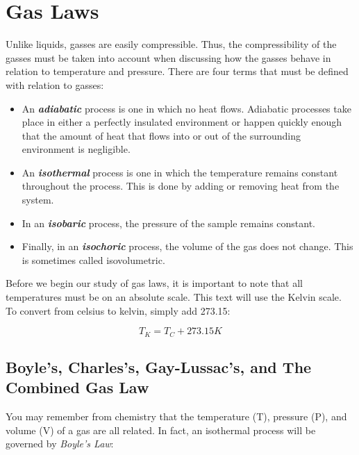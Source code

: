 \chapter{Gas Laws}
Unlike liquids, gasses are easily compressible.  Thus, the compressibility of the gasses must be taken into account when discussing how the gasses behave in relation to temperature and pressure.   There are four terms that must be defined with relation to gasses:
\begin{itemize}
	\item An \textbf{\textit{adiabatic}}  process is one in which no heat flows.  Adiabatic processes take place in either a perfectly insulated environment or happen quickly enough that the amount of heat that flows into or out of the surrounding environment is negligible. 
	
	\item An \textit{\textbf{isothermal}}  process is one in which the temperature remains constant throughout the process.  This is done by adding or removing heat from the system.  
	
	\item In an \textbf{\textit{isobaric}}  process, the pressure of the sample remains constant.  
	
	\item Finally, in an \textit{\textbf{isochoric}}  process, the volume of the gas does not change.  This is sometimes called isovolumetric. 
	\end{itemize}
	
Before we begin our study of gas laws, it is important to note that all temperatures must be on an absolute scale.  This text will use the Kelvin scale.   To convert from celsius to kelvin, simply add 273.15: 
	
		\begin{mdframed}[backgroundcolor=orange!20!white]
		\begin{equation}
			T_K = T_C + 273.15\si{K}
			\label{equation:celsiuskelvinconvertion}
		\end{equation}
	\end{mdframed}	


	\section{Boyle's, Charles's, Gay-Lussac's, and The Combined Gas Law}
	You may remember from chemistry that the temperature (T), pressure (P), and volume (V) of a gas are all related.  In fact, an isothermal process will be governed by \textit{Boyle's Law}: 
	

